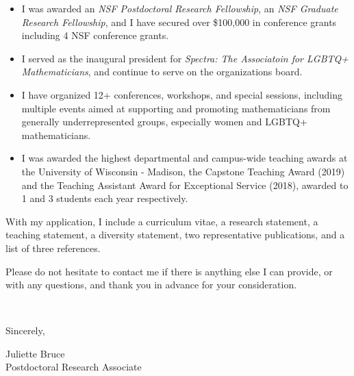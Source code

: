 \documentclass[11pt]{article}
\begin{document}
\begin{itemize}[leftmargin=*]
\item I was awarded an \textit{NSF Postdoctoral Research Fellowship}, an \textit{NSF Graduate Research Fellowship}, and I have secured over \$100,000 in conference grants including 4 NSF conference grants. 
\item I served as the inaugural president for \textit{Spectra: The Associatoin for LGBTQ+ Mathematicians}, and continue to serve on the organizations board. 
\item I have organized 12+ conferences, workshops, and special sessions, including multiple events aimed at supporting and promoting mathematicians from generally underrepresented groups, especially women and LGBTQ+ mathematicians. 
\item I was awarded the highest departmental and campus-wide teaching awards at the University of Wisconsin - Madison, the Capstone Teaching Award (2019) and the Teaching Assistant Award for Exceptional Service (2018), awarded to 1 and 3 students each year respectively. 
\end{itemize}

With my application, I include a curriculum vitae, a research statement, a teaching statement, a diversity statement, two representative publications, and a list of three references. 

Please do not hesitate to contact me if there is anything else I can provide, or with any questions, and thank you in advance for your consideration. 

\vspace{24pt}
\noindent
\begin{minipage}{0.99\textwidth}
\begin{minipage}{0.69\textwidth}
\textcolor{white}{.}
\end{minipage}
\begin{minipage}{0.29\textwidth}
Sincerely, 

\vspace{36pt}
Juliette Bruce\\
Postdoctoral Research Associate\end{minipage}
\end{minipage}

\end{document}
